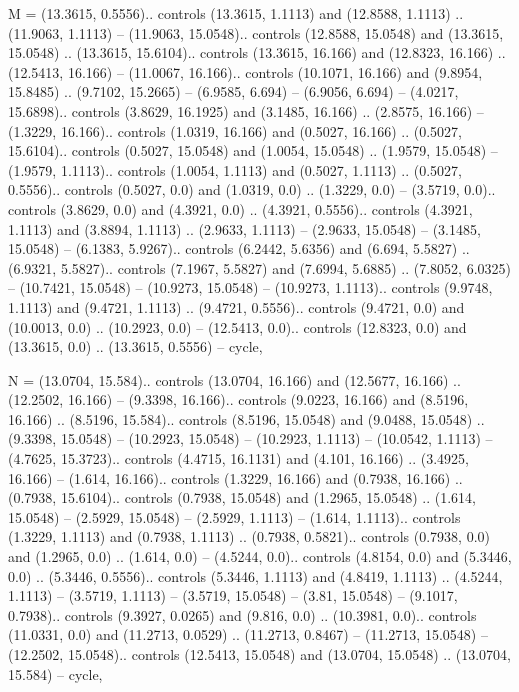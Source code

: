 M = {(13.3615, 0.5556).. controls (13.3615, 1.1113) and (12.8588, 1.1113) .. (11.9063, 1.1113) -- (11.9063, 15.0548).. controls (12.8588, 15.0548) and (13.3615, 15.0548) .. (13.3615, 15.6104).. controls (13.3615, 16.166) and (12.8323, 16.166) .. (12.5413, 16.166) -- (11.0067, 16.166).. controls (10.1071, 16.166) and (9.8954, 15.8485) .. (9.7102, 15.2665) -- (6.9585, 6.694) -- (6.9056, 6.694) -- (4.0217, 15.6898).. controls (3.8629, 16.1925) and (3.1485, 16.166) .. (2.8575, 16.166) -- (1.3229, 16.166).. controls (1.0319, 16.166) and (0.5027, 16.166) .. (0.5027, 15.6104).. controls (0.5027, 15.0548) and (1.0054, 15.0548) .. (1.9579, 15.0548) -- (1.9579, 1.1113).. controls (1.0054, 1.1113) and (0.5027, 1.1113) .. (0.5027, 0.5556).. controls (0.5027, 0.0) and (1.0319, 0.0) .. (1.3229, 0.0) -- (3.5719, 0.0).. controls (3.8629, 0.0) and (4.3921, 0.0) .. (4.3921, 0.5556).. controls (4.3921, 1.1113) and (3.8894, 1.1113) .. (2.9633, 1.1113) -- (2.9633, 15.0548) -- (3.1485, 15.0548) -- (6.1383, 5.9267).. controls (6.2442, 5.6356) and (6.694, 5.5827) .. (6.9321, 5.5827).. controls (7.1967, 5.5827) and (7.6994, 5.6885) .. (7.8052, 6.0325) -- (10.7421, 15.0548) -- (10.9273, 15.0548) -- (10.9273, 1.1113).. controls (9.9748, 1.1113) and (9.4721, 1.1113) .. (9.4721, 0.5556).. controls (9.4721, 0.0) and (10.0013, 0.0) .. (10.2923, 0.0) -- (12.5413, 0.0).. controls (12.8323, 0.0) and (13.3615, 0.0) .. (13.3615, 0.5556) -- cycle},

N = {(13.0704, 15.584).. controls (13.0704, 16.166) and (12.5677, 16.166) .. (12.2502, 16.166) -- (9.3398, 16.166).. controls (9.0223, 16.166) and (8.5196, 16.166) .. (8.5196, 15.584).. controls (8.5196, 15.0548) and (9.0488, 15.0548) .. (9.3398, 15.0548) -- (10.2923, 15.0548) -- (10.2923, 1.1113) -- (10.0542, 1.1113) -- (4.7625, 15.3723).. controls (4.4715, 16.1131) and (4.101, 16.166) .. (3.4925, 16.166) -- (1.614, 16.166).. controls (1.3229, 16.166) and (0.7938, 16.166) .. (0.7938, 15.6104).. controls (0.7938, 15.0548) and (1.2965, 15.0548) .. (1.614, 15.0548) -- (2.5929, 15.0548) -- (2.5929, 1.1113) -- (1.614, 1.1113).. controls (1.3229, 1.1113) and (0.7938, 1.1113) .. (0.7938, 0.5821).. controls (0.7938, 0.0) and (1.2965, 0.0) .. (1.614, 0.0) -- (4.5244, 0.0).. controls (4.8154, 0.0) and (5.3446, 0.0) .. (5.3446, 0.5556).. controls (5.3446, 1.1113) and (4.8419, 1.1113) .. (4.5244, 1.1113) -- (3.5719, 1.1113) -- (3.5719, 15.0548) -- (3.81, 15.0548) -- (9.1017, 0.7938).. controls (9.3927, 0.0265) and (9.816, 0.0) .. (10.3981, 0.0).. controls (11.0331, 0.0) and (11.2713, 0.0529) .. (11.2713, 0.8467) -- (11.2713, 15.0548) -- (12.2502, 15.0548).. controls (12.5413, 15.0548) and (13.0704, 15.0548) .. (13.0704, 15.584) -- cycle},

